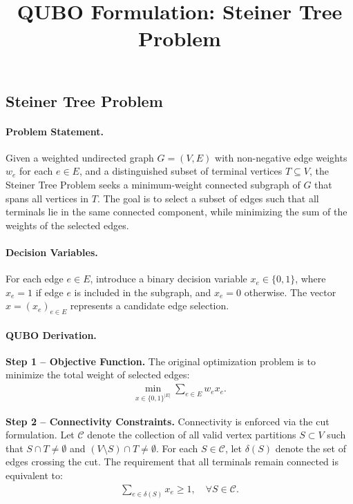 \documentclass[12pt]{article}
\title{QUBO Formulation: Steiner Tree Problem}
\date{}
\begin{document}
\maketitle

\subsection*{Steiner Tree Problem}

\paragraph{Problem Statement.}
Given a weighted undirected graph $G = (V, E)$ with non-negative edge weights $w_e$ for each $e \in E$, and a distinguished subset of terminal vertices $T \subseteq V$, the Steiner Tree Problem seeks a minimum-weight connected subgraph of $G$ that spans all vertices in $T$. The goal is to select a subset of edges such that all terminals lie in the same connected component, while minimizing the sum of the weights of the selected edges.

\paragraph{Decision Variables.}
For each edge $e \in E$, introduce a binary decision variable $x_e \in \{0, 1\}$, where $x_e = 1$ if edge $e$ is included in the subgraph, and $x_e = 0$ otherwise. The vector $x = (x_e)_{e \in E}$ represents a candidate edge selection.

\paragraph{QUBO Derivation.}
\textbf{Step 1 -- Objective Function.} The original optimization problem is to minimize the total weight of selected edges:
\begin{align}
\min_{x \in \{0,1\}^{|E|}} \sum_{e \in E} w_e x_e.
\end{align}

\textbf{Step 2 -- Connectivity Constraints.} Connectivity is enforced via the cut formulation. Let $\mathcal{C}$ denote the collection of all valid vertex partitions $S \subset V$ such that $S \cap T \neq \emptyset$ and $(V \setminus S) \cap T \neq \emptyset$. For each $S \in \mathcal{C}$, let $\delta(S)$ denote the set of edges crossing the cut. The requirement that all terminals remain connected is equivalent to:
\begin{align}
\sum_{e \in \delta(S)} x_e \geq 1, \quad \forall S \in \mathcal{C}.
\end{align}
\end{document}
